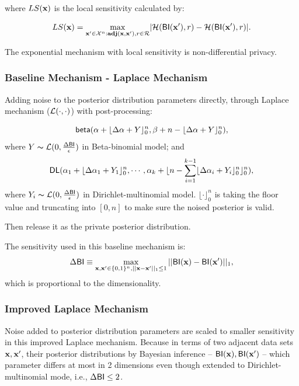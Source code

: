 \documentclass{article}
\begin{document}
where $LS(\textbf{x})$ is the local sensitivity calculated by:

\begin{equation*}
LS(\textbf{x})=\max_{\textbf{x}' \in \mathcal{X}^n:\textbf{adj}(\textbf{x},\textbf{x}'), r\in \mathcal{R}}\lvert \mathcal{H}(\mathsf{BI}(\textbf{x}'), r) - \mathcal{H}(\mathsf{BI}(\textbf{x}'), r)\rvert.
\end{equation*}

The exponential mechanism with local sensitivity is non-differential privacy\cite{dwork2014algorithmic}.



\subsubsection{Baseline Mechanism - Laplace Mechanism}
 Adding noise to the posterior distribution parameters directly, through Laplace mechanism ($\mathcal{L}(\cdot, \cdot)$) with post-processing:

 \[
 \mathsf{beta}(\alpha +  \lfloor{\Delta \alpha + Y}\rfloor^n_0,\beta + n - \lfloor{\Delta \alpha + Y}\rfloor^n_0),
 \] 
 where $Y \thicksim \mathcal{L}(0, \frac{\Delta \mathsf{BI}}{\epsilon})$ in Beta-binomial model; and
 \[
 \mathsf{DL}(\alpha_1 +  \lfloor{\Delta \alpha_1 + Y_1}\rfloor^n_0, \cdots, \alpha_k + \lfloor n - \sum_{i = 1}^{k-1}\lfloor{\Delta \alpha_i + Y_i}\rfloor^n_0 \rfloor^n_0),
 \]
 where $Y_i \thicksim \mathcal{L}(0, \frac{\Delta \mathsf{BI}}{\epsilon})$ in Dirichlet-multinomial model. $\lfloor \cdot \rfloor^n_0$ is taking the floor value and truncating into $[0,n]$ to make sure the noised posterior is valid.

 Then release it as the private posterior distribution.

 The sensitivity used in this baseline mechanism is:
 \[
 \Delta \mathsf{BI} \equiv \max\limits_{\textbf{x}, \textbf{x}' \in \{0,1\}^{n}, ||\textbf{x} - \textbf{x}'||_1 \leq 1} ||\mathsf{BI}(\textbf{x}) - \mathsf{BI}(\textbf{x}')||_1,
 \]
 which is proportional to the dimensionality.


\subsubsection{Improved Laplace Mechanism}

 Noise added to posterior distribution parameters are scaled to smaller sensitivity in this improved Laplace mechanism. Because in terms of two adjacent data sets $\textbf{x}, \textbf{x}'$, their posterior distributions by Bayesian inference -- $\mathsf{BI}(\textbf{x}), \mathsf{BI}(\textbf{x}')$ -- which parameter differs at most in 2 dimensions even though extended to Dirichlet-multinomial mode, i.e., $\Delta \mathsf{BI} \leq 2$. 
\end{document}

